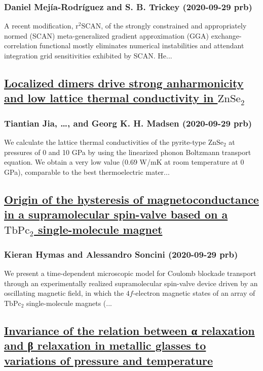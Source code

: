 \subsubsection*{Daniel Mejía-Rodríguez and S. B. Trickey (2020-09-29 prb)}
A recent modification, $\mathrm{r}^{2}\mathrm{SCAN}$, of the strongly constrained and appropriately normed (SCAN) meta-generalized gradient approximation (GGA) exchange-correlation functional mostly eliminates numerical instabilities and attendant integration grid sensitivities exhibited by SCAN. He...
\subsection*{\href{http://link.aps.org/doi/10.1103/PhysRevB.102.125204}{Localized dimers drive strong anharmonicity and low lattice thermal conductivity in $\mathrm{Zn}{\mathrm{Se}}_{2}$}}
\subsubsection*{Tiantian Jia, \dots, and Georg K. H. Madsen (2020-09-29 prb)}
We calculate the lattice thermal conductivities of the pyrite-type $\mathrm{Zn}{\mathrm{Se}}_{2}$ at pressures of 0 and 10 GPa by using the linearized phonon Boltzmann transport equation. We obtain a very low value (0.69 W/mK at room temperature at 0 GPa), comparable to the best thermoelectric mater...
\subsection*{\href{http://link.aps.org/doi/10.1103/PhysRevB.102.125310}{Origin of the hysteresis of magnetoconductance in a supramolecular spin-valve based on a $\mathrm{Tb}{\mathrm{Pc}}_{2}$ single-molecule magnet}}
\subsubsection*{Kieran Hymas and Alessandro Soncini (2020-09-29 prb)}
We present a time-dependent microscopic model for Coulomb blockade transport through an experimentally realized supramolecular spin-valve device driven by an oscillating magnetic field, in which the $4f$-electron magnetic states of an array of $\mathrm{Tb}{\mathrm{Pc}}_{2}$ single-molecule magnets (...
\subsection*{\href{http://link.aps.org/doi/10.1103/PhysRevB.102.094205}{Invariance of the relation between α relaxation and β relaxation in metallic glasses to variations of pressure and temperature}}
